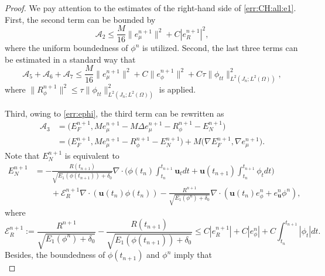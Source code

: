 \documentclass[10pt,a4paper]{amsart}
\newcommand{\malA}{\mathcal{A}}
\newcommand{\malE}{\mathcal{E}}
\begin{document}
\begin{proof}
	We pay attention to the estimates of the right-hand side of \eqref{err:CH:all:e1}. First, the second term can be bounded by
	\begin{equation*} 
		\malA_2\leq   \frac{M}{16}\|e_\mu^{n+1}\|^2+C|e_R^{n+1}|^2,
	\end{equation*}
	where the uniform boundedness of $\phi^n$ is utilized. Second, the last three terms can be estimated in a standard way that 
	\begin{equation*} 
		\malA_{5} + \malA_{6} +  \malA_{7}
		\le \frac{M}{16}\|e_\mu^{n+1}\|^2+ C\| e_\phi^{n+1}\|^2+ C\tau \|\phi_{tt}\|_{L^2(J_n ; L^2(\Omega))}^2,
	\end{equation*}
	where	$\|R_\phi^{n+1}\|^2 \le \tau \|\phi_{tt}\|_{L^2(J_n ; L^2(\Omega))}^2$ 	is applied.
	
	Third, owing to \eqref{err:ephi}, the third term can be rewritten as
	\begin{equation*}
		\begin{aligned}
			\malA_3
			&=\big(E_F^{n+1}, M e_\mu^{n+1}-M \Delta e_\mu^{n+1}-R_\phi^{n+1}-E_N^{n+1}\big) \\
			& =\big(E_F^{n+1}, M e_\mu^{n+1}-R_\phi^{n+1}-E_N^{n+1}\big)+M\big(\nabla E_F^{n+1}, \nabla e_\mu^{n+1}\big). %
		\end{aligned}
	\end{equation*}
	Note that $E_N^{n+1}$ is equivalent to  
	\begin{equation} \label{err:EN:all}
		\begin{aligned}
			E_N^{n+1} 
			& =  -\frac{R(t_{n+1})}{\sqrt{E_1(\phi(t_{n+1}))+\delta_0}}  
			\nabla \cdot\Big( \phi(t_n)\int_{t_n}^{t_{n+1}} \bm u_t dt+\bm u (t_{n+1}) \int_{t_n}^{t_{n+1}} \phi_t dt \Big) \\
			& \qquad  + \malE_R^{n+1} \nabla \cdot{\left(\bm u (t_{n}) \phi(t_{n})\right)} -\frac{R^{n+1}}{\sqrt{E_1(\phi^n)+\delta_0}} \nabla \cdot\left(\bm u (t_{n}) e_\phi^n+e_{\bm u }^n \phi^n\right),
		\end{aligned}
	\end{equation}
	where 
	\begin{equation} \label{err:Er}
		\malE_R^{n+1}:=\frac{R^{n+1}}{\sqrt{E_1(\phi^n)+\delta_0}}-\frac{R(t_{n+1})}{\sqrt{E_1(\phi(t_{n+1}))+\delta_0}} 
		\le C|e_R^{n+1}|+ C|e_\phi^n|  +C\int_{t_n}^{t_{n+1}}|\phi_t| dt.
	\end{equation}
	Besides, the boundedness of $\phi(t_{n+1})$ and $\phi^n$ imply that
	\begin{equation}  \label{err:E_F}

\end{equation}
\end{proof}
\end{document}
